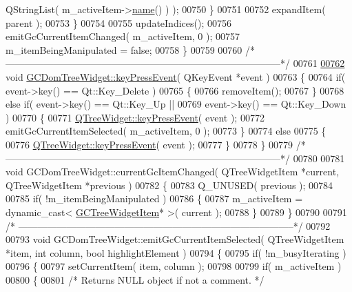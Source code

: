 \begin{DoxyCode}
      QStringList( m\_activeItem->\hyperlink{class_g_c_tree_widget_item_a3af8c66a690cd55986a38b996a375ba4}{name}() ) );
00750     \}
00751 
00752     expandItem( parent );
00753   \}
00754 
00755   updateIndices();
00756   emitGcCurrentItemChanged( m\_activeItem, 0 );
00757   m\_itemBeingManipulated = \textcolor{keyword}{false};
00758 \}
00759 
00760 \textcolor{comment}{/*
      --------------------------------------------------------------------------------------*/}
00761 
\hypertarget{gcdomtreewidget_8cpp_source_l00762}{}\hyperlink{class_g_c_dom_tree_widget_ae79022f5265210c71c2a80eb662e3a81}{00762} \textcolor{keywordtype}{void} \hyperlink{class_g_c_dom_tree_widget_ae79022f5265210c71c2a80eb662e3a81}{GCDomTreeWidget::keyPressEvent}( QKeyEvent *event )
00763 \{
00764   \textcolor{keywordflow}{if}( event->key() == Qt::Key\_Delete )
00765   \{
00766     removeItem();
00767   \}
00768   \textcolor{keywordflow}{else} \textcolor{keywordflow}{if}( event->key() == Qt::Key\_Up ||
00769            \textcolor{keyword}{event}->key() == Qt::Key\_Down )
00770   \{
00771     \hyperlink{class_g_c_dom_tree_widget_ae79022f5265210c71c2a80eb662e3a81}{QTreeWidget::keyPressEvent}( event );
00772     emitGcCurrentItemSelected( m\_activeItem, 0 );
00773   \}
00774   \textcolor{keywordflow}{else}
00775   \{
00776     \hyperlink{class_g_c_dom_tree_widget_ae79022f5265210c71c2a80eb662e3a81}{QTreeWidget::keyPressEvent}( event );
00777   \}
00778 \}
00779 \textcolor{comment}{/*
      --------------------------------------------------------------------------------------*/}
00780 
00781 \textcolor{keywordtype}{void} GCDomTreeWidget::currentGcItemChanged( QTreeWidgetItem *current, 
      QTreeWidgetItem *previous )
00782 \{
00783   Q\_UNUSED( previous );
00784 
00785   \textcolor{keywordflow}{if}( !m\_itemBeingManipulated )
00786   \{
00787     m\_activeItem = \textcolor{keyword}{dynamic\_cast<} \hyperlink{class_g_c_tree_widget_item}{GCTreeWidgetItem}* \textcolor{keyword}{>}( current );
00788   \}
00789 \}
00790 
00791 \textcolor{comment}{/*
      --------------------------------------------------------------------------------------*/}
00792 
00793 \textcolor{keywordtype}{void} GCDomTreeWidget::emitGcCurrentItemSelected( QTreeWidgetItem *item, \textcolor{keywordtype}{int} 
      column, \textcolor{keywordtype}{bool} highlightElement )
00794 \{
00795   \textcolor{keywordflow}{if}( !m\_busyIterating )
00796   \{
00797     setCurrentItem( item, column );
00798 
00799     \textcolor{keywordflow}{if}( m\_activeItem )
00800     \{
00801       \textcolor{comment}{/* Returns NULL object if not a comment. */}

\end{DoxyCode}
